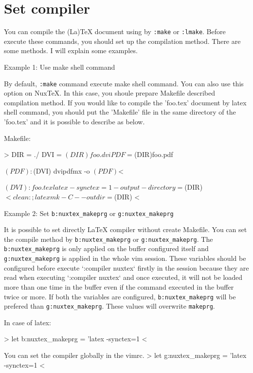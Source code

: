 \section{Set compiler}

You can compile the (La)TeX document using by \verb|:make| or \verb|:lmake|. Before execute these commands, you should set up the compilation method.
There are some methods. I will explain some examples.

Example 1: Use make shell command ~

By default, \verb|:make| command execute make shell command. You can also use this option on NuxTeX.
In this case, you shoule prepare Makefile described compilation method.
If you would like to compile the 'foo.tex' document by latex shell command, you should put the 'Makefile' file in the same directory of the 'foo.tex' and it is possible to describe as below.

Makefile:
\begin{verbatim*}
>
	DIR = ./
	DVI = $(DIR)foo.dvi
	PDF = $(DIR)foo.pdf
	
	$(PDF):    $(DVI)
		dvipdfmx -o $(PDF) $<
	
	$(DVI):    foo.tex
		latex -synctex=1 -output-directory=$(DIR) $<
	
	clean:; latexmk -C --outdir=$(DIR) 
<
\end{verbatim*}

Example 2: Set \verb|b:nuxtex_makeprg| or \verb|g:nuxtex_makeprg|

It is possible to set directly LaTeX compiler without create Makefile. You can set the compile method by \verb|b:nuxtex_makeprg| or \verb|g:nuxtex_makeprg|.  The \verb|b:nuxtex_makeprg| is only applied on the buffer configured itself and \verb|g:nuxtex_makeprg| is applied in the whole vim session. These variables should be configured before execute `:compiler nuxtex` firstly in the session because they are read when executing `:compiler nuxtex` and once executed, it will not be loaded more than one time in the buffer even if the command executed in the buffer twice or more.
If both the variables are configured, \verb|b:nuxtex_makeprg| will be prefered than \verb|g:nuxtex_makeprg|.
These values will overwrite \verb|makeprg|.

In case of latex:
\begin{verbatim*}
>
	let b:nuxtex_makeprg = 'latex -synctex=1 %:p'
<

You can set the compiler globally in the vimrc.
>
	let g:nuxtex_makeprg = 'latex -synctex=1 %:p'
<
\end{verbatim*}

